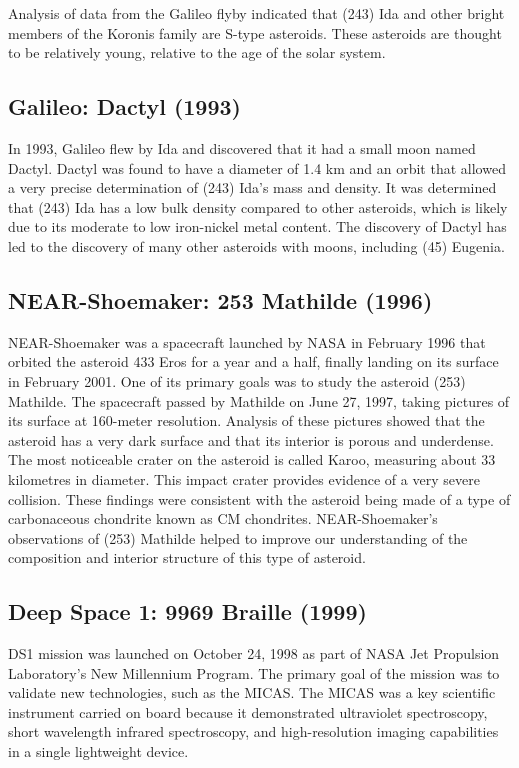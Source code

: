 Analysis of data from the Galileo flyby indicated that (243) Ida and other bright members of the Koronis family are S-type asteroids. These asteroids are thought to be relatively young, relative to the age of the solar system.

\subsection{Galileo: Dactyl (1993)}

In 1993, Galileo flew by Ida and discovered that it had a small moon named Dactyl. Dactyl was found to have a diameter of 1.4 km and an orbit that allowed a very precise determination of (243) Ida's mass and density. It was determined that (243) Ida has a low bulk density compared to other asteroids, which is likely due to its moderate to low iron-nickel metal content. The discovery of Dactyl has led to the discovery of many other asteroids with moons, including (45) Eugenia.

\subsection{NEAR-Shoemaker: 253 Mathilde (1996)}

NEAR-Shoemaker was a spacecraft launched by NASA in February 1996 that orbited the asteroid 433 Eros for a year and a half, finally landing on its surface in February 2001. One of its primary goals was to study the asteroid (253) Mathilde. The spacecraft passed by Mathilde on June 27, 1997, taking pictures of its surface at 160-meter resolution. Analysis of these pictures showed that the asteroid has a very dark surface and that its interior is porous and underdense. The most noticeable crater on the asteroid is called Karoo, measuring about 33 kilometres in diameter. This impact crater provides evidence of a very severe collision. These findings were consistent with the asteroid being made of a type of carbonaceous chondrite known as CM chondrites.  NEAR-Shoemaker's observations of (253) Mathilde helped to improve our understanding of the composition and interior structure of this type of asteroid.

\subsection{Deep Space 1: 9969 Braille (1999)}

\Gls{DS1} mission was launched on October 24, 1998 as part of \gls{NASA} Jet Propulsion Laboratory's New Millennium Program. The primary goal of the mission was to validate new technologies, such as the \gls{MICAS}. The \gls{MICAS} was a key scientific instrument carried on board because it demonstrated ultraviolet spectroscopy, short wavelength infrared spectroscopy, and high-resolution imaging capabilities in a single lightweight device. 

